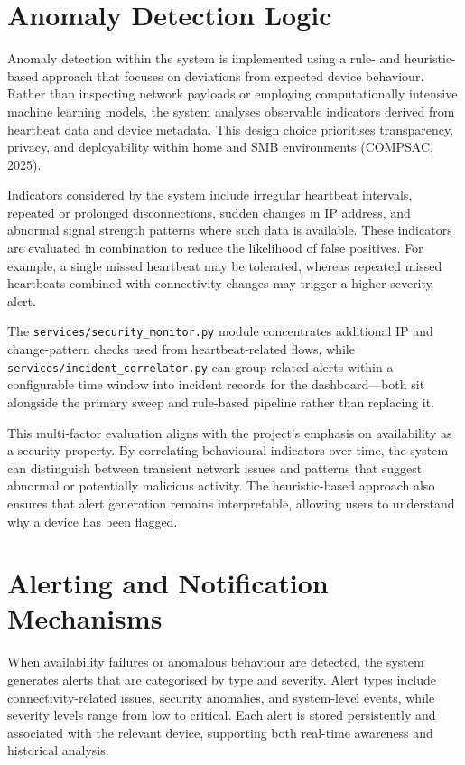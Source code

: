 \section{Anomaly Detection Logic}

Anomaly detection within the system is implemented using a rule- and heuristic-based approach that focuses on deviations from expected device behaviour. Rather than inspecting network payloads or employing computationally intensive machine learning models, the system analyses observable indicators derived from heartbeat data and device metadata. This design choice prioritises transparency, privacy, and deployability within home and SMB environments (COMPSAC, 2025).

Indicators considered by the system include irregular heartbeat intervals, repeated or prolonged disconnections, sudden changes in IP address, and abnormal signal strength patterns where such data is available. These indicators are evaluated in combination to reduce the likelihood of false positives. For example, a single missed heartbeat may be tolerated, whereas repeated missed heartbeats combined with connectivity changes may trigger a higher-severity alert.

The \texttt{services/security\_monitor.py} module concentrates additional IP and change-pattern checks used from heartbeat-related flows, while \texttt{services/incident\_correlator.py} can group related alerts within a configurable time window into incident records for the dashboard---both sit alongside the primary sweep and rule-based pipeline rather than replacing it.

This multi-factor evaluation aligns with the project's emphasis on availability as a security property. By correlating behavioural indicators over time, the system can distinguish between transient network issues and patterns that suggest abnormal or potentially malicious activity. The heuristic-based approach also ensures that alert generation remains interpretable, allowing users to understand why a device has been flagged.

\section{Alerting and Notification Mechanisms}

When availability failures or anomalous behaviour are detected, the system generates alerts that are categorised by type and severity. Alert types include connectivity-related issues, security anomalies, and system-level events, while severity levels range from low to critical. Each alert is stored persistently and associated with the relevant device, supporting both real-time awareness and historical analysis.

